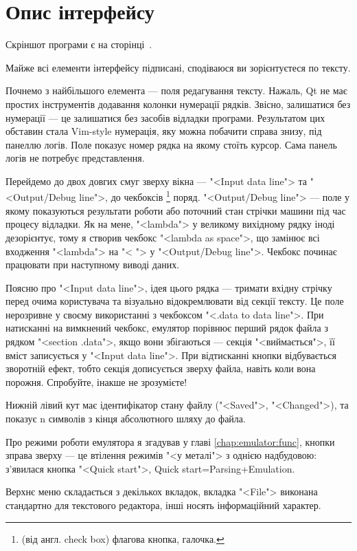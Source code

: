 \documentclass[oneside,final,14pt]{extreport}
\begin{document}
\section{Опис інтерфейсу}
Скріншот програми є на сторінці \,\pageref{screenshot}.
\medskip

Майже всі елементи інтерфейсу підписані, сподіваюся ви зорієнтуєтеся по тексту.

Почнемо з найбільшого елемента --- поля редагування тексту. Нажаль, Qt не має простих інструментів додавання колонки нумерації рядків. Звісно, залишатися без нумерації --- це залишатися без засобів відладки програми. Результатом цих обставин стала Vim-style нумерація, яку можна побачити справа знизу, під панеллю логів. Поле показує номер рядка на якому стоїть курсор. Сама панель логів не потребує представлення.

Перейдемо до двох довгих смуг зверху вікна ---  "<Input data line"> та "<Output/Debug line">, до чекбоксів
\footnote{(від англ. check box) флагова кнопка, галочка.}
поряд. "<Output/Debug line"> --- поле у якому показуються результати роботи або поточний стан стрічки машини під час процесу відладки. Як на мене, "<lambda"> у великому вихідному рядку іноді дезорієнтує, тому я створив  чекбокс "<lambda as space">, що замінює всі входження "<lambda"> на "< "> у "<Output/Debug line">. Чекбокс починає працювати при наступному виводі даних.

Поясню про "<Input data line">, ідея цього рядка --- тримати вхідну стрічку перед очима користувача та візуально відокремлювати від секції тексту. Це поле нерозривне у своєму використанні з чекбоксом "<.data to data line">. При натисканні на вимкнений чекбокс, емулятор порівнює перший рядок файла з рядком "<section .data">, якщо вони збігаються --- секція "<виймається">, її вміст записується у "<Input data line">. При відтисканні кнопки відбувається зворотній ефект, тобто секція дописується зверху файла, навіть коли вона порожня. Спробуйте, інакше не зрозумієте!

Нижній лівий кут має ідентифікатор стану файлу ("<Saved">, "<Changed">), та показує n символів з кінця абсолютного шляху до файла.

Про режими роботи емулятора я згадував у главі
\ref{chap:emulator:func}, кнопки зправа зверху --- це втілення режимів "<у металі"> з однією надбудовою: з'явилася кнопка "<Quick start">, Quick start=Parsing+Emulation.

Верхнє меню складається з декількох вкладок, вкладка "<File"> виконана стандартно для текстового редактора, інші носять інформаційний характер.
\end{document}

